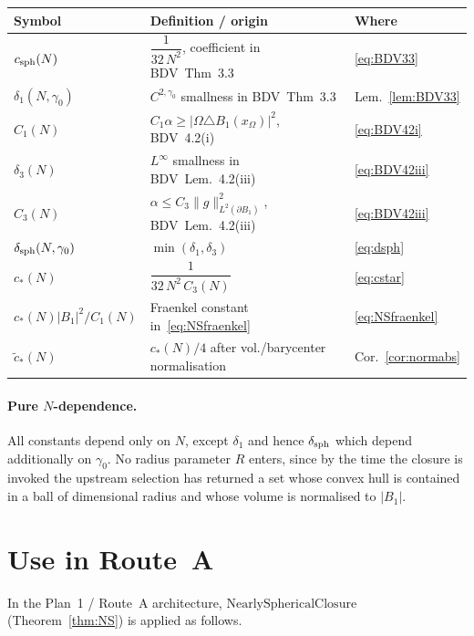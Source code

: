 \documentclass[11pt]{article}
\theoremstyle{definition}
\newcommand{\bdy}{\partial}
\newcommand{\NS}{\mathrm{NearlySphericalClosure}}
\begin{document}
\begin{center}
\renewcommand{\arraystretch}{1.25}
\begin{tabular}{@{}lll@{}}
\toprule
\textbf{Symbol} & \textbf{Definition / origin} & \textbf{Where} \\
\midrule
$c_{\rm sph}(N)$ & $\dfrac{1}{32\,N^2}$, coefficient in BDV~Thm~3.3 &
\eqref{eq:BDV33}\\
$\delta_1(N,\gamma_0)$ & $C^{2,\gamma_0}$ smallness in BDV~Thm~3.3 &
Lem.~\ref{lem:BDV33}\\
$C_1(N)$ & $C_1\alpha\ge|\Omega\triangle B_1(x_\Omega)|^2$, BDV~4.2(i) &
\eqref{eq:BDV42i}\\
$\delta_3(N)$ & $L^\infty$ smallness in BDV~Lem.~4.2(iii) &
\eqref{eq:BDV42iii}\\
$C_3(N)$ & $\alpha\le C_3\|g\|_{L^2(\bdy B_1)}^2$, BDV~Lem.~4.2(iii) &
\eqref{eq:BDV42iii}\\
\midrule
$\delta_{\rm sph}(N,\gamma_0)$ & $\min(\delta_1,\delta_3)$ &
\eqref{eq:dsph}\\
$c_*(N)$ & $\dfrac{1}{32\,N^2\,C_3(N)}$ & \eqref{eq:cstar}\\
$c_*(N)|B_1|^{2}/C_1(N)$ & Fraenkel constant in~\eqref{eq:NSfraenkel} &
\eqref{eq:NSfraenkel}\\
$\widetilde{c}_*(N)$ & $c_*(N)/4$ after vol./barycenter normalisation &
Cor.~\ref{cor:normabs}\\
\bottomrule
\end{tabular}
\end{center}

\paragraph{Pure $N$-dependence.}
All constants depend only on $N$, except $\delta_1$ and hence
$\delta_{\rm sph}$ which depend additionally on $\gamma_0$. No radius
parameter $R$ enters, since by the time the closure is invoked the
upstream selection has returned a set whose convex hull is contained in
a ball of dimensional radius and whose volume is normalised to $|B_1|$.

\section{Use in Route~A}\label{sec:routeA}

In the Plan~1 / Route~A architecture, $\NS$ (Theorem~\ref{thm:NS}) is
applied as follows.
\end{document}
